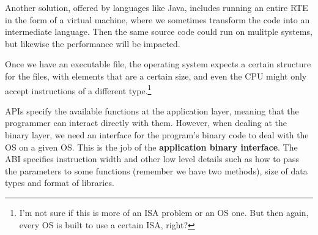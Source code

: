 \documentclass{tufte-handout}
\begin{document}
Another solution, offered by languages like Java, includes running an entire RTE in 
the form of a virtual machine, where we sometimes transform the code into an 
intermediate language. Then the same source code could run on mulitple systems, 
but likewise the performance will be impacted. 

Once we have an executable file, the operating system expects a certain structure
for the files, with elements that are a certain size, and even the CPU might only 
accept instructions of a different type.\footnote{I'm not sure if this is more of an 
ISA problem or an OS one. But then again, every OS is built to use a certain 
ISA, right?}

APIs specify the available functions at the application layer, meaning that the 
programmer can interact directly with them. However, when dealing at the binary
layer, we need an interface for the program's binary code to deal with 
the OS on a given OS. This is the job of the \textbf{application binary interface}.
The ABI specifies instruction width and other low level details such as how to 
pass the parameters to some functions (remember we have two methods), size of data types
and format of libraries.
\end{document}
